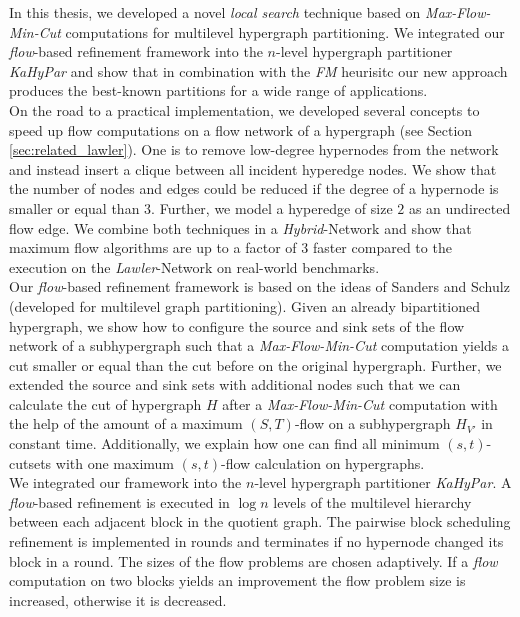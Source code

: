 In this thesis, we developed a novel \emph{local search} technique based on \emph{Max-Flow-Min-Cut}
computations for multilevel hypergraph partitioning. We integrated our \emph{flow}-based
refinement framework into the $n$-level hypergraph partitioner \emph{KaHyPar} and show that
in combination with the \emph{FM} heurisitc our new approach produces the best-known partitions
for a wide range of applications.\\
On the road to a practical implementation, we developed several concepts to speed up flow
computations on a flow network of a hypergraph (see Section \ref{sec:related_lawler}).
One is to remove low-degree hypernodes from the network and instead insert a clique 
between all incident hyperedge nodes. We show that the number of nodes and edges could
be reduced if the degree of a hypernode is smaller or equal than $3$. Further, we model a hyperedge
of size $2$ as an undirected flow edge. We combine both techniques in a \emph{Hybrid}-Network 
and show that maximum flow algorithms are up to a factor of $3$ faster compared to
the execution on the \emph{Lawler}-Network \cite{lawler1973} on real-world benchmarks. \\
Our \emph{flow}-based refinement framework is based on the ideas of Sanders and Schulz
\cite{sanders2011engineering} (developed for multilevel graph partitioning). Given an already bipartitioned
hypergraph, we show how to configure the source and sink sets of the flow network 
of a subhypergraph such that a \emph{Max-Flow-Min-Cut} computation yields a cut smaller 
or equal than the cut before on the original hypergraph. Further, we extended the source
and sink sets with additional nodes such that we can calculate the cut of hypergraph $H$
after a \emph{Max-Flow-Min-Cut} computation with the help of the amount of a maximum $(S,T)$-flow
on a subhypergraph $H_{V'}$ in constant time. Additionally, we explain how one can find all 
minimum $(s,t)$-cutsets with one maximum $(s,t)$-flow calculation on hypergraphs. \\
We integrated our framework into the $n$-level hypergraph partitioner
\emph{KaHyPar}. A \emph{flow}-based refinement is executed in $\log{n}$ levels of the multilevel
hierarchy between each adjacent block in the quotient graph. The pairwise block scheduling 
refinement is implemented in rounds and terminates if no hypernode changed its block in a round.
The sizes of the flow problems are chosen adaptively. If a \emph{flow} computation on two blocks
yields an improvement the flow problem size is increased, otherwise it is decreased. 
